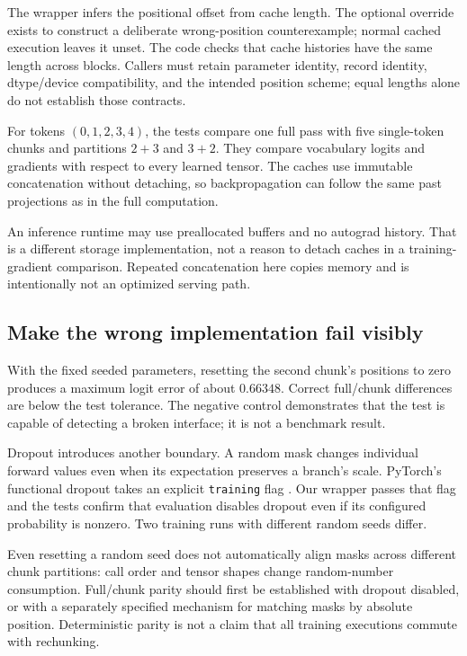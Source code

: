 The wrapper infers the positional offset from cache length. The optional override exists to construct a deliberate wrong-position counterexample; normal cached execution leaves it unset. The code checks that cache histories have the same length across blocks. Callers must retain parameter identity, record identity, dtype/device compatibility, and the intended position scheme; equal lengths alone do not establish those contracts.

For tokens $(0,1,2,3,4)$, the tests compare one full pass with five single-token chunks and partitions $2+3$ and $3+2$. They compare vocabulary logits and gradients with respect to every learned tensor. The caches use immutable concatenation without detaching, so backpropagation can follow the same past projections as in the full computation.

An inference runtime may use preallocated buffers and no autograd history. That is a different storage implementation, not a reason to detach caches in a training-gradient comparison. Repeated concatenation here copies memory and is intentionally not an optimized serving path.

\subsection{Make the wrong implementation fail visibly}
With the fixed seeded parameters, resetting the second chunk's positions to zero produces a maximum logit error of about $0.66348$. Correct full/chunk differences are below the test tolerance. The negative control demonstrates that the test is capable of detecting a broken interface; it is not a benchmark result.

Dropout introduces another boundary. A random mask changes individual forward values even when its expectation preserves a branch's scale. PyTorch's functional dropout takes an explicit \texttt{training} flag \cite{dropout}. Our wrapper passes that flag and the tests confirm that evaluation disables dropout even if its configured probability is nonzero. Two training runs with different random seeds differ.

Even resetting a random seed does not automatically align masks across different chunk partitions: call order and tensor shapes change random-number consumption. Full/chunk parity should first be established with dropout disabled, or with a separately specified mechanism for matching masks by absolute position. Deterministic parity is not a claim that all training executions commute with rechunking.

